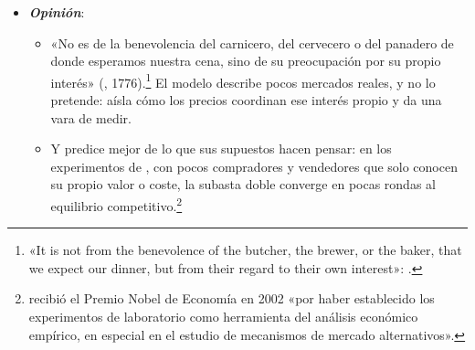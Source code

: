 \documentclass[11pt]{article}
\begin{document}
\begin{itemize}
  \begin{itemize}
  \item El equilibrio parcial basta para un mercado pequeño y poco conectado con el resto; cuando un mercado pesa mucho o se transmite con fuerza a otros, como un tratado comercial o un impuesto sobre el trabajo, hace falta el equilibrio general , y para la relación entre equilibrio, eficiencia y fallos de mercado, la economía del bienestar  .
  \item Al levantar los supuestos de la competencia perfecta:
    \begin{itemize}
    \item sin el de muchos vendedores precio-aceptantes (4) o el de producto homogéneo (3) se llega al monopolio, la competencia monopolística y el oligopolio   ;
    \item sin el de información perfecta (2), a la economía de la información ;
    \item con pocas empresas, la amenaza de entrada puede bastar para disciplinarlas en los mercados impugnables .
    \end{itemize}
  \item La crítica de  a las expectativas de la telaraña está en el origen de las expectativas racionales .
  \end{itemize}
\item \textbf{\emph{Opinión}}:
  \begin{itemize}
  \item «No es de la benevolencia del carnicero, del cervecero o del panadero de donde esperamos nuestra cena, sino de su preocupación por su propio interés» (, 1776).\footnote{«It is not from the benevolence of the butcher, the brewer, or the baker, that we expect our dinner, but from their regard to their own interest»: \textcite[libro~I, cap.~2]{Smith1776Wealth}.} El modelo describe pocos mercados reales, y no lo pretende: aísla cómo los precios coordinan ese interés propio y da una vara de medir.
  \item Y predice mejor de lo que sus supuestos hacen pensar: en los experimentos de \textcite{Smith1962Experimental}, con pocos compradores y vendedores que solo conocen su propio valor o coste, la subasta doble converge en pocas rondas al equilibrio competitivo.\footnote{ recibió el Premio Nobel de Economía en 2002 «por haber establecido los experimentos de laboratorio como herramienta del análisis económico empírico, en especial en el estudio de mecanismos de mercado alternativos»\nocite{Nobel2002Smith}.}

\end{itemize}
\end{itemize}
\end{document}

